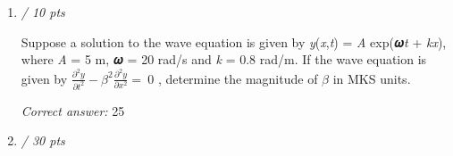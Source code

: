 \documentclass[11pt]{article}
\begin{document}
\begin{enumerate}[leftmargin=*,label=\textbf{Question \arabic*.}]
\textit{Answer 1:}
\begin{itemize}
  \item 132
  \item 113
  \item 142
  \item 125
  \item \textbf{[correct]} 151
\end{itemize}
\textit{Answer 2:}
\begin{itemize}
  \item 208
  \item \textbf{[correct]} 226
  \item 113
  \item 238
  \item 300
\end{itemize}
\textit{Answer 3:}
\begin{itemize}
  \item \textbf{[correct]} 0.0278
  \item 0.0297
  \item 0.0254
  \item 0.0332
  \item 0.0413
\end{itemize}
\textit{Answer 4:}
\begin{itemize}
  \item 0.238
  \item 0.118
  \item 1.24
  \item 1.39
  \item 0.184
  \item 0.412
  \item 0.200
  \item 1.82
  \item \textbf{[correct]} 1.50
  \item 1.16
\end{itemize}

\item \hfill \textit{/ 10 pts}

Suppose a solution to the wave equation is given by \emph{y}(\emph{x},\emph{t}) = \emph{A} exp(𝝎\emph{t} + \emph{kx}), where \emph{A} = 5 m, 𝝎 = 20 rad/s and \emph{k} = 0.8 rad/m. If the wave equation is given by $\frac{\partial^2y}{\partial t^2}-\beta^2\frac{\partial^2y}{\partial x^2}=\:0$ , determine the magnitude of $\beta$ in MKS units.

\textit{Correct answer: } 25

\item \hfill \textit{/ 30 pts}


\end{enumerate}
\end{document}
